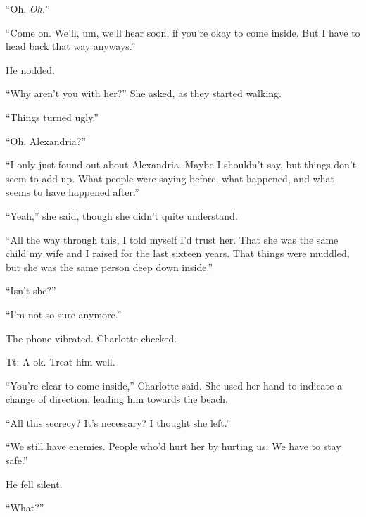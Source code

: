 ``Oh.  \emph{Oh.}''



``Come on.  We'll, um, we'll hear soon, if you're okay to come inside.  But I have to head back that way anyways.''



He nodded.



``Why aren't you with her?''  She asked, as they started walking.



``Things turned ugly.''



``Oh.  Alexandria?''



``I only just found out about Alexandria.  Maybe I shouldn't say, but things don't seem to add up.  What people were saying before, what happened, and what seems to have happened after.''



``Yeah,'' she said, though she didn't quite understand.



``All the way through this, I told myself I'd trust her.  That she was the same child my wife and I raised for the last sixteen years.  That things were muddled, but she was the same person deep down inside.''



``Isn't she?''



``I'm not so sure anymore.''



The phone vibrated.  Charlotte checked.



Tt:
A-ok.  Treat him well.



``You're clear to come inside,'' Charlotte said.  She used her hand to indicate a change of direction, leading him towards the beach.



``All this secrecy?  It's necessary?  I thought she left.''



``We still have enemies.  People who'd hurt her by hurting us.  We have to stay safe.''



He fell silent.



``What?''



